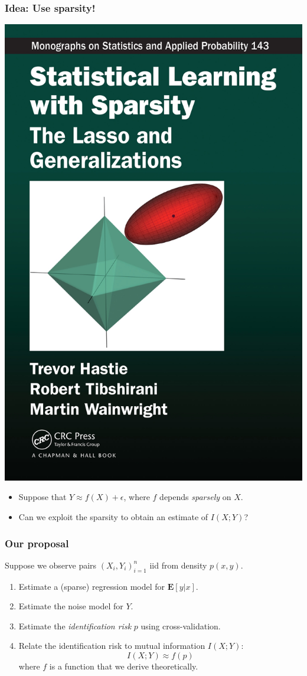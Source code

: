 \documentclass{beamer}
\newcommand{\E}{\textbf{E}}
\begin{document}
\begin{frame}
\frametitle{Idea: Use sparsity!}
\begin{center}
\includegraphics[scale = 0.05]{sls.jpg}
\end{center}
\begin{itemize}
\item Suppose that $Y \approx f(X) + \epsilon$, where $f$ depends \emph{sparsely} on $X$.
\item Can we exploit the sparsity to obtain an estimate of $I(X; Y)$?
\end{itemize}
\end{frame}


\begin{frame}
\frametitle{Our proposal}
Suppose we observe pairs $(X_i,Y_i)_{i=1}^n$ iid from density $p(x, y)$.
\begin{enumerate}
\item Estimate a (sparse) regression model for $\E[y|x]$.
\item Estimate the noise model for $Y$.
\item Estimate the \emph{identification risk} $p$ using cross-validation.
\item Relate the identification risk to mutual information $I(X; Y)$:
\[
I(X; Y) \approx f(p)
\]
where $f$ is a function that we derive theoretically. 
\end{enumerate}
\end{frame}
\end{document}
